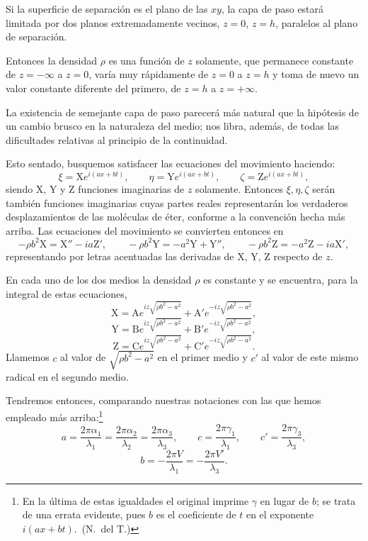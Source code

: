 Si la superficie de separación es el plano de las $xy$, la capa de paso
estará limitada por dos planos extremadamente vecinos, $z=0$, $z=h$,
paralelos al plano de separación.

Entonces la densidad $\rho$ es una función de $z$ solamente, que
permanece constante de $z=-\infty$ a $z=0$, varía muy rápidamente de $z=0$
a $z=h$ y toma de nuevo un valor constante diferente del primero, de
$z=h$ a $z=+\infty$.

La existencia de semejante capa de paso parecerá más natural que la
hipótesis de un cambio brusco en la naturaleza del medio; nos libra,
además, de todas las dificultades relativas al principio de la
continuidad.

Esto sentado, busquemos satisfacer las ecuaciones del movimiento haciendo:
\[
\xi=\mathrm{X}e^{i(ax+bt)},\qquad \eta=\mathrm{Y}e^{i(ax+bt)},\qquad
\zeta=\mathrm{Z}e^{i(ax+bt)},
\]
siendo X, Y y Z funciones imaginarias de $z$ solamente. Entonces
$\xi,\eta,\zeta$ serán también funciones imaginarias cuyas partes reales
representarán los verdaderos desplazamientos de las moléculas de éter,
conforme a la convención hecha más arriba. Las ecuaciones del movimiento
se convierten entonces en
\[
-\rho b^2\mathrm{X}=\mathrm{X}''-ia\mathrm{Z}',\qquad
-\rho b^2\mathrm{Y}=-a^2\mathrm{Y}+\mathrm{Y}'',\qquad
-\rho b^2\mathrm{Z}=-a^2\mathrm{Z}-ia\mathrm{X}',
\]
representando por letras acentuadas las derivadas de X, Y, Z respecto de
$z$.

En cada uno de los dos medios la densidad $\rho$ es constante y se
encuentra, para la integral de estas ecuaciones,
\[
\mathrm{X}=\mathrm{A}e^{iz\sqrt{\rho b^2-a^2}}+\mathrm{A}'e^{-iz\sqrt{\rho b^2-a^2}},
\]
\[
\mathrm{Y}=\mathrm{B}e^{iz\sqrt{\rho b^2-a^2}}+\mathrm{B}'e^{-iz\sqrt{\rho b^2-a^2}},
\]
\[
\mathrm{Z}=\mathrm{C}e^{iz\sqrt{\rho b^2-a^2}}+\mathrm{C}'e^{-iz\sqrt{\rho b^2-a^2}}.
\]
Llamemos $c$ al valor de $\sqrt{\rho b^2-a^2}$ en el primer medio y $c'$
al valor de este mismo radical en el segundo medio.

Tendremos entonces, comparando nuestras notaciones con las que hemos
empleado más arriba:\footnote{En la última de estas igualdades el
original imprime $\gamma$ en lugar de $b$; se trata de una errata
evidente, pues $b$ es el coeficiente de $t$ en el exponente $i(ax+bt)$.~(N.~del T.)}
\[
a=\frac{2\pi\alpha_1}{\lambda_1}=\frac{2\pi\alpha_2}{\lambda_2}=\frac{2\pi\alpha_3}{\lambda_3},
\qquad
c=\frac{2\pi\gamma_1}{\lambda_1},\qquad c'=\frac{2\pi\gamma_3}{\lambda_3},
\]
\[
b=-\frac{2\pi V}{\lambda_1}=-\frac{2\pi V'}{\lambda_3}.
\]

